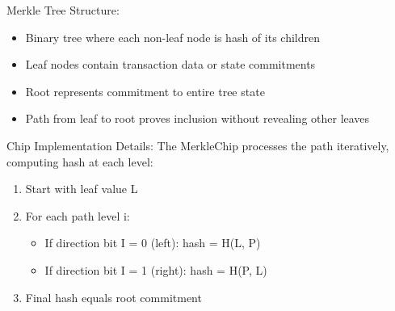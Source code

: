 \documentclass[11pt,a4paper]{article}
\begin{document}
Merkle Tree Structure:
\begin{itemize}
    \item Binary tree where each non-leaf node is hash of its children
    \item Leaf nodes contain transaction data or state commitments
    \item Root represents commitment to entire tree state
    \item Path from leaf to root proves inclusion without revealing other leaves
\end{itemize}

Chip Implementation Details:
The MerkleChip processes the path iteratively, computing hash at each level:
\begin{enumerate}
    \item Start with leaf value L
    \item For each path level i:
        \begin{itemize}
            \item If direction bit I = 0 (left): hash = H(L, P)
            \item If direction bit I = 1 (right): hash = H(P, L)
        \end{itemize}
    \item Final hash equals root commitment
\end{enumerate}
\end{document}
